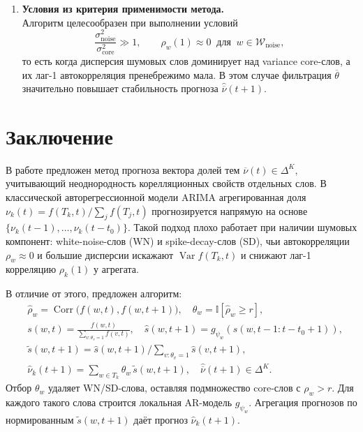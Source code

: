 \documentclass[14pt,a4paper]{article}
\begin{document}
{\begin{enumerate}
\item
\textbf{Условия из критерия применимости метода.}\\
Алгоритм целесообразен при выполнении условий
\[
  \frac{\sigma_{\mathrm{noise}}^{2}}
       {\sigma_{\mathrm{core}}^{2}}
  \gg 1,
  \qquad
  \rho_{w}(1)\approx0
  \;\;\text{для}\;\;
  w\in\mathcal W_{\mathrm{noise}},
\]
то есть когда дисперсия шумовых слов
доминирует над variance core-слов,
а их лаг-1 автокорреляция пренебрежимо мала.
В этом случае фильтрация
\(
  \overline{\theta}
\)
значительно повышает
стабильность прогноза
\(
  \widehat{\overline{\nu}}(t+1).
\)
\end{enumerate}



\newpage
\section{Заключение}
\label{ssec:conclusion}

В работе предложен метод прогноза вектора долей тем 
\(\overline{\nu}(t)\in\Delta^{K}\), учитывающий неоднородность корелляционных свойств отдельных слов. 
В классической авторегрессионной модели ARIMA 
агрегированная доля 
\(\nu_{k}(t)=f(T_{k},t)/\sum_{j}f(T_{j},t)\) 
прогнозируется напрямую на основе $\{\nu_k(t-1),\dots,\nu_k(t-t_0)\}$. 
Такой подход плохо работает при наличии шумовых компонент:  
white-noise-слов (WN) и spike-decay-слов (SD), чьи автокорреляции $\rho_w\approx0$ 
и большие дисперсии искажают $\operatorname{Var}f(T_k,t)$ и снижают лаг-1 корреляцию $\rho_k(1)$ у агрегата.  

В отличие от этого, предложен алгоритм:
\[
  \begin{aligned}
    &\widehat{\rho}_w=\operatorname{Corr}\bigl(f(w,t),f(w,t+1)\bigr),\quad
    \theta_w=\mathbb I[\widehat{\rho}_w\ge r],\\
    &s(w,t)=\frac{f(w,t)}{\sum_{v:\theta_v=1}f(v,t)},\quad
    \widehat{s}(w,t+1)=g_{\psi_w}(s(w,t-1{:}t-t_0+1)),\\
    &\widetilde{s}(w,t+1)=
      \widehat{s}(w,t+1)\big/\sum_{v:\theta_v=1}\widehat{s}(v,t+1),\\
    &\widehat{\nu}_k(t+1)
      =\sum_{w\in T_k}\theta_w\,\widetilde{s}(w,t+1),
      \quad
      \widehat{\overline{\nu}}(t+1)\in\Delta^K.
  \end{aligned}
\]
Отбор $\theta_w$ удаляет WN/SD-слова, оставляя подмножество core-слов с $\rho_w>r$. 
Для каждого такого слова строится локальная AR-модель $g_{\psi_w}$. 
Агрегация прогнозов по нормированным $\widetilde{s}(w,t+1)$ даёт прогноз $\widehat{\nu}_k(t+1)$.  

}
\end{document}

